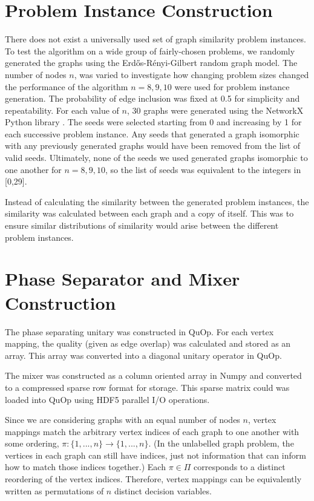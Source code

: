 \section{Problem Instance Construction}\label{sec:problem const}
There does not exist a universally used set of graph similarity problem instances. To test the algorithm on a wide group of fairly-chosen problems, we randomly generated the graphs using the Erdős-Rényi-Gilbert random graph model\cite{erdos_renyi,gilbert}.
The number of nodes $n$, was varied to investigate how changing problem sizes changed the performance of the algorithm $n=8,9,10$ were used for problem instance generation. The probability of edge inclusion was fixed at 0.5 for simplicity and repeatability. For each value of $n$, 30 graphs were generated using the NetworkX Python library \cite{networkx}. The seeds were selected starting from 0 and increasing by 1 for each successive problem instance. Any seeds that generated a graph isomorphic with any previously generated graphs would have been removed from the list of valid seeds. Ultimately, none of the seeds we used generated graphs isomorphic to one another for $n=8,9,10$, so the list of seeds was equivalent to the integers in [0,29].

Instead of calculating the similarity between the generated problem instances, the similarity was calculated between each graph and a copy of itself. This was to ensure similar distributions of similarity would arise between the different problem instances.

\section{Phase Separator and Mixer Construction}
The phase separating unitary was constructed in QuOp. For each vertex mapping, the quality (given as edge overlap) was calculated and stored as an array. This array was converted into a diagonal unitary operator in QuOp.

The mixer was constructed as a column oriented array in Numpy \cite{numpy} and converted to a compressed sparse row format for storage. This sparse matrix could was loaded into QuOp using HDF5 parallel I/O operations\cite{hdf5}.

Since we are considering graphs with an equal number of nodes $n$, vertex mappings match the arbitrary vertex indices of each graph to one another with some ordering, $\pi:\{1,...,n\}\to\{1,...,n\}$. (In the unlabelled graph problem, the vertices in each graph can still have indices, just not information that can inform how to match those indices together.) Each $\pi\in\Pi$ corresponds to a distinct reordering of the vertex indices. Therefore, vertex mappings can be equivalently written as permutations of $n$ distinct decision variables.

